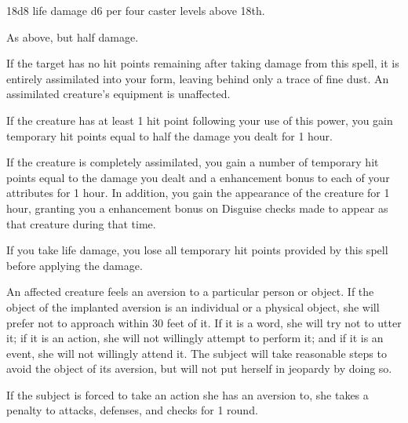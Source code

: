 \begin{spellsuccess}
    18d8 life damage \add d6 per four caster levels above 18th. 
\end{spellsuccess}
\begin{spellfailure}
    As above, but half damage.
\end{spellfailure}
\begin{spelleffect}
    If the target has no hit points remaining after taking damage from this spell, it is entirely assimilated into your form, leaving behind only a trace of fine dust. An assimilated creature's equipment is unaffected.
    \par If the creature has at least 1 hit point following your use of this power, you gain temporary hit points equal to half the damage you dealt for 1 hour.
    \par If the creature is completely assimilated, you gain a number of temporary hit points equal to the damage you dealt and a  enhancement bonus to each of your attributes for 1 hour. In addition, you gain the appearance of the creature for 1 hour, granting you a  enhancement bonus on Disguise checks made to appear as that creature during that time.
\end{spelleffect}
\begin{spellnotes}
    If you take life damage, you lose all temporary hit points provided by this spell before applying the damage.
\end{spellnotes}

\spelldur{\durshort}
\begin{spellsuccess}
    An affected creature feels an aversion to a particular person or object. If the object of the implanted aversion is an individual or a physical object, she will prefer not to approach within 30 feet of it. If it is a word, she will try not to utter it; if it is an action, she will not willingly attempt to perform it; and if it is an event, she will not willingly attend it. The subject will take reasonable steps to avoid the object of its aversion, but will not put herself in jeopardy by doing so.
    \par If the subject is forced to take an action she has an aversion to, she takes a  penalty to attacks, defenses, and checks for 1 round.
\end{spellsuccess}

